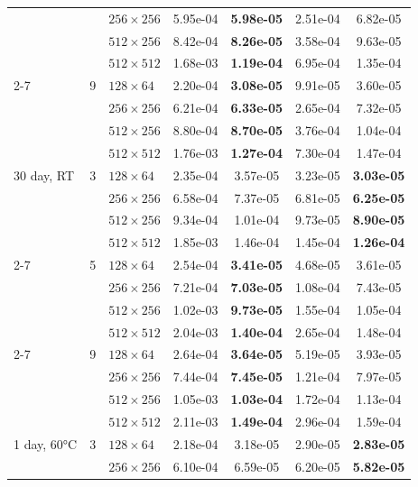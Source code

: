 \begin{table}[htb]
\begin{tabular}{l l l  c c c c}
     &  & $256\times256$ & 5.95e-04 & \textbf{5.98e-05} & 2.51e-04 & 6.82e-05 \\
     &  & $512\times256$ & 8.42e-04 & \textbf{8.26e-05} & 3.58e-04 & 9.63e-05 \\
     &  & $512\times512$ & 1.68e-03 & \textbf{1.19e-04} & 6.95e-04 & 1.35e-04 \\
    \cmidrule(lr){2-7}
     & 9 & $128\times64$ & 2.20e-04 & \textbf{3.08e-05} & 9.91e-05 & 3.60e-05 \\
     &  & $256\times256$ & 6.21e-04 & \textbf{6.33e-05} & 2.65e-04 & 7.32e-05 \\
     &  & $512\times256$ & 8.80e-04 & \textbf{8.70e-05} & 3.76e-04 & 1.04e-04 \\
     &  & $512\times512$ & 1.76e-03 & \textbf{1.27e-04} & 7.30e-04 & 1.47e-04 \\
    \midrule
    30 day, RT & 3 & $128\times64$ & 2.35e-04 & 3.57e-05 & 3.23e-05 & \textbf{3.03e-05} \\
     &  & $256\times256$ & 6.58e-04 & 7.37e-05 & 6.81e-05 & \textbf{6.25e-05} \\
     &  & $512\times256$ & 9.34e-04 & 1.01e-04 & 9.73e-05 & \textbf{8.90e-05} \\
     &  & $512\times512$ & 1.85e-03 & 1.46e-04 & 1.45e-04 & \textbf{1.26e-04} \\
    \cmidrule(lr){2-7}
     & 5 & $128\times64$ & 2.54e-04 & \textbf{3.41e-05} & 4.68e-05 & 3.61e-05 \\
     &  & $256\times256$ & 7.21e-04 & \textbf{7.03e-05} & 1.08e-04 & 7.43e-05 \\
     &  & $512\times256$ & 1.02e-03 & \textbf{9.73e-05} & 1.55e-04 & 1.05e-04 \\
     &  & $512\times512$ & 2.04e-03 & \textbf{1.40e-04} & 2.65e-04 & 1.48e-04 \\
    \cmidrule(lr){2-7}
     & 9 & $128\times64$ & 2.64e-04 & \textbf{3.64e-05} & 5.19e-05 & 3.93e-05 \\
     &  & $256\times256$ & 7.44e-04 & \textbf{7.45e-05} & 1.21e-04 & 7.97e-05 \\
     &  & $512\times256$ & 1.05e-03 & \textbf{1.03e-04} & 1.72e-04 & 1.13e-04 \\
     &  & $512\times512$ & 2.11e-03 & \textbf{1.49e-04} & 2.96e-04 & 1.59e-04 \\
    \midrule
    1 day, 60°C & 3 & $128\times64$ & 2.18e-04 & 3.18e-05 & 2.90e-05 & \textbf{2.83e-05} \\
     &  & $256\times256$ & 6.10e-04 & 6.59e-05 & 6.20e-05 & \textbf{5.82e-05} \\

\end{tabular}
\end{table}
